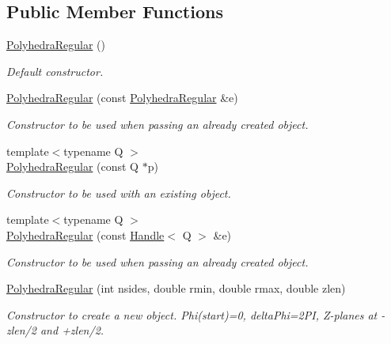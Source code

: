 \subsection*{Public Member Functions}
\begin{DoxyCompactItemize}
\item 
\hyperlink{class_d_d4hep_1_1_geometry_1_1_polyhedra_regular_ab24a6fb73d056c11d84ab439ad9fa785}{PolyhedraRegular} ()
\begin{DoxyCompactList}\small\item\em Default constructor. \item\end{DoxyCompactList}\item 
\hyperlink{class_d_d4hep_1_1_geometry_1_1_polyhedra_regular_ac18aa1f617bfcdbf07aef7aa020d5784}{PolyhedraRegular} (const \hyperlink{class_d_d4hep_1_1_geometry_1_1_polyhedra_regular}{PolyhedraRegular} \&e)
\begin{DoxyCompactList}\small\item\em Constructor to be used when passing an already created object. \item\end{DoxyCompactList}\item 
{\footnotesize template$<$typename Q $>$ }\\\hyperlink{class_d_d4hep_1_1_geometry_1_1_polyhedra_regular_afa1b9c6651dddf2914285ea518952483}{PolyhedraRegular} (const Q $\ast$p)
\begin{DoxyCompactList}\small\item\em Constructor to be used with an existing object. \item\end{DoxyCompactList}\item 
{\footnotesize template$<$typename Q $>$ }\\\hyperlink{class_d_d4hep_1_1_geometry_1_1_polyhedra_regular_a41de4e7386705efc5b22529f2f4c2de5}{PolyhedraRegular} (const \hyperlink{class_d_d4hep_1_1_handle}{Handle}$<$ Q $>$ \&e)
\begin{DoxyCompactList}\small\item\em Constructor to be used when passing an already created object. \item\end{DoxyCompactList}\item 
\hyperlink{class_d_d4hep_1_1_geometry_1_1_polyhedra_regular_a81603bb686b56fd58fd78942907c1fb6}{PolyhedraRegular} (int nsides, double rmin, double rmax, double zlen)
\begin{DoxyCompactList}\small\item\em Constructor to create a new object. Phi(start)=0, deltaPhi=2PI, Z-\/planes at -\/zlen/2 and +zlen/2. \item\end{DoxyCompactList}\item 

\end{DoxyCompactItemize}
